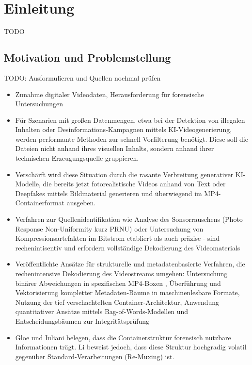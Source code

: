 \chapter{Einleitung}

TODO


\section{Motivation und Problemstellung}

TODO: Ausformulieren und Quellen nochmal prüfen\\

\begin{itemize}
    \item Zunahme digitaler Videodaten, Herausforderung für forensische Untersuchungen \cite{europol_common_2024}
    \item Für Szenarien mit großen Datenmengen, etwa bei der Detektion von illegalen Inhalten oder Desinformations-Kampagnen mittels KI-Videogenerierung, werden performante Methoden zur schnell Vorfilterung benötigt. Diese soll die Dateien nicht anhand ihres visuellen Inhalts, sondern anhand ihrer technischen Erzeugungsquelle gruppieren.
    \item Verschärft wird diese Situation durch die rasante Verbreitung generativer KI-Modelle, die bereits jetzt fotorealistische Videos anhand von Text oder Deepfakes mittels Bildmaterial generieren und überwiegend im MP4-Containerformat ausgeben.
    \item Verfahren zur Quellenidentifikation wie Analyse des Sonsorrauschens (Photo Response Non-Uniformity kurz PRNU)\cite{lukas_digital_2006} oder Untersuchung von Kompressionsartefakten\cite{li_inference_2018} im Bitstrom etabliert als auch präzise - sind rechenintisentiv und erfordern vollständige Dekodierung des Videomaterials
    \item Veröffentlichte Ansätze für strukturelle und metadatenbasierte Verfahren, die rechenintensive Dekodierung des Videostreams umgehen: Untersuchung binärer Abweichungen in spezifischen MP4-Boxen \cite{hasan_forensic_2021}, Überführung und Vektorisierung kompletter Metadaten-Bäume in maschinenlesbare Formate\cite{xiang_forensic_2021}, Nutzung der tief verschachtelten Container-Architektur\cite{ramos_lopez_digital_2020}, Anwendung quantitativer Ansätze mittels Bag-of-Words-Modellen und Entscheidungsbäumen zur Integritätsprüfung\cite{yang_efficient_2020}
    \item Gloe\cite{gloe_forensic_2014} und Iuliani\cite{iuliani_video_2019} belegen, dass die Containerstruktur forensisch nutzbare Informationen trägt. Li\cite{li_learning_2024} beweist jedoch, dass diese Struktur hochgradig volatil gegenüber Standard-Verarbeitungen (Re-Muxing) ist.

\end{itemize}
